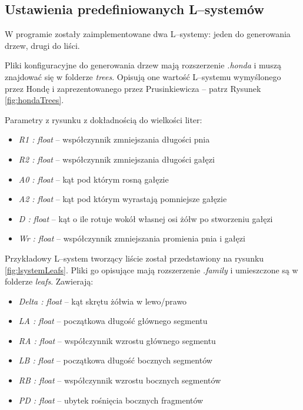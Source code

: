 \documentclass[inz,shortabstract]{iithesis}
\begin{document}
        \subsection{Ustawienia predefiniowanych L--systemów}
        W programie zostały zaimplementowane dwa L--systemy: jeden do generowania drzew, drugi do liści.
        
        Pliki konfiguracyjne do generowania drzew mają rozszerzenie \textit{.honda} i muszą znajdować się w folderze \textit{trees}. Opisują one wartość L--systemu wymyślonego przez Hondę \cite{honda} i zaprezentowanego przez Prusinkiewicza \cite{plants} -- patrz Rysunek \ref{fig:hondaTrees}.
        
        Parametry z rysunku z dokładnością do wielkości liter:
        \begin{itemize}
            \item \textit{R1 : float} -- współczynnik zmniejszania długości pnia
            \item \textit{R2 : float} -- współczynnik zmniejszania długości gałęzi
            \item \textit{A0 : float} -- kąt pod którym rosną gałęzie
            \item \textit{A2 : float} -- kąt pod którym wyrastają pomniejsze gałęzie
            \item \textit{D : float} -- kąt o ile rotuje wokół własnej osi żółw po stworzeniu gałęzi
            \item \textit{Wr : float} -- współczynnik zmniejszania promienia pnia i gałęzi
        \end{itemize}    
        
        Przykładowy L--system tworzący liście został przedstawiony na rysunku \ref{fig:lsystemLeafs}. Pliki go opisujące mają rozszerzenie \textit{.family} i umieszczone są w folderze \textit{leafs}. Zawierają:
        \begin{itemize}
            \item \textit{Delta : float} -- kąt skrętu żółwia w lewo/prawo
            \item \textit{LA : float} -- początkowa długość głównego segmentu
            \item \textit{RA : float} -- współczynnik wzrostu głównego segmentu
            \item \textit{LB : float} -- początkowa długość bocznych segmentów
            \item \textit{RB : float} -- współczynnik wzrostu bocznych segmentów
            \item \textit{PD : float} -- ubytek rośnięcia bocznych fragmentów
        \end{itemize}    
        
\end{document}
